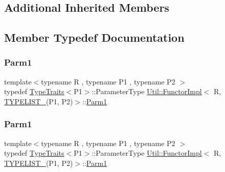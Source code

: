 \subsection*{Additional Inherited Members}


\subsection{Member Typedef Documentation}
\mbox{\label{classUtil_1_1FunctorImpl_3_01R_00_01TYPELIST__2_07P1_00_01P2_08_4_a74b37eda530bf33969c4a0eadc2596a5}} 
\subsubsection{\texorpdfstring{Parm1}{Parm1}\hspace{0.1cm}{\footnotesize\ttfamily [1/2]}}
{\footnotesize\ttfamily template$<$typename R , typename P1 , typename P2 $>$ \\
typedef \mbox{\hyperlink{classUtil_1_1TypeTraits}{Type\+Traits}}$<$P1$>$\+::Parameter\+Type \mbox{\hyperlink{classUtil_1_1FunctorImpl}{Util\+::\+Functor\+Impl}}$<$ R, \mbox{\hyperlink{install_2include_2adat_2typelist_8h_a311cb99af993804c6737ae46c5cbfaff}{T\+Y\+P\+E\+L\+I\+S\+T\+\_}}(P1, P2)$>$\+::\mbox{\hyperlink{structUtil_1_1Private_1_1FunctorImplBase_a9d61e693d6c616dea5bd9d9073c7d21a}{Parm1}}}

\mbox{\label{classUtil_1_1FunctorImpl_3_01R_00_01TYPELIST__2_07P1_00_01P2_08_4_a74b37eda530bf33969c4a0eadc2596a5}} 
\subsubsection{\texorpdfstring{Parm1}{Parm1}\hspace{0.1cm}{\footnotesize\ttfamily [2/2]}}
{\footnotesize\ttfamily template$<$typename R , typename P1 , typename P2 $>$ \\
typedef \mbox{\hyperlink{classUtil_1_1TypeTraits}{Type\+Traits}}$<$P1$>$\+::Parameter\+Type \mbox{\hyperlink{classUtil_1_1FunctorImpl}{Util\+::\+Functor\+Impl}}$<$ R, \mbox{\hyperlink{install_2include_2adat_2typelist_8h_a311cb99af993804c6737ae46c5cbfaff}{T\+Y\+P\+E\+L\+I\+S\+T\+\_}}(P1, P2)$>$\+::\mbox{\hyperlink{structUtil_1_1Private_1_1FunctorImplBase_a9d61e693d6c616dea5bd9d9073c7d21a}{Parm1}}}

